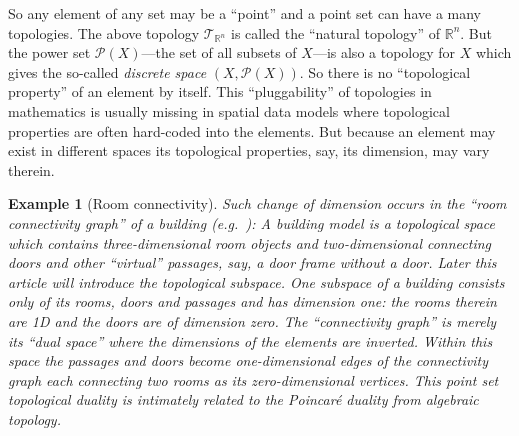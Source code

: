 \documentclass[5p]{elsarticle}
\newtheorem{example}{Example}
\newcommand{\qq}[1]{``#1''}
\begin{document}
So any element of any set may be a \qq{point} and a point set can have a many topologies. 
The above topology $\mathcal{T}_{\mathbb{R}^n}$ is called the \qq{natural topology} 
of $\mathbb{R}^n$. 
But the power set $\mathcal{P}(X)$---the set of all subsets of 
$X$---is also a topology for $X$ which gives the so-called 
\emph{discrete space} $(X,\mathcal{P}(X))$. 
So there is no \qq{topological property} of an element by itself. 
This \qq{pluggability} of topologies in mathematics is usually missing in spatial data models 
where topological properties are often hard-coded into the elements. 
But because an element may exist in different spaces its topological properties, say, its 
dimension, may vary therein. 

\begin{sloppy} \begin{example}[Room connectivity]\label{exa:connectivity} 
Such change of dimension occurs in the \qq{room connectivity graph} of a 
building (e.g.\ \cite{Jensen:Indoor}): 
A building model is a topological space which contains 
three-dimensional room objects and two-dimensional connecting doors and other 
\qq{virtual} passages, say, a door frame without a door. 
Later this article will introduce the topological subspace. 
One subspace of a building consists only of its rooms, doors and passages 
and has dimension one: the rooms therein are 1D and the doors are 
of dimension zero. 
The \qq{connectivity graph} is merely its \qq{dual space} where the dimensions 
of the elements are inverted. 
Within this space the passages and doors become one-dimensional edges of the 
connectivity graph each connecting two rooms as its zero-dimensional vertices. 
This \emph{point set} topological duality is intimately related to the Poincar\'e 
duality from \emph{algebraic} topology. 
\end{example}
\end{sloppy} 
\end{document}
